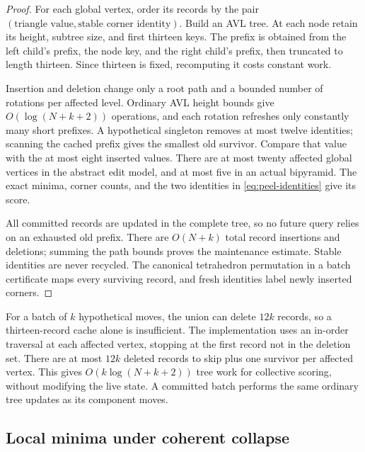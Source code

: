 \begin{proof}
For each global vertex, order its records by the pair
$(\text{triangle value},\text{stable corner identity})$. Build an AVL tree.
At each node retain its height, subtree size, and first thirteen keys.
The prefix is obtained from the left child's prefix, the node key, and
the right child's prefix, then truncated to length thirteen. Since
thirteen is fixed, recomputing it costs constant work.

Insertion and deletion change only a root path and a bounded number of
rotations per affected level. Ordinary AVL height bounds give
$O(\log(N+k+2))$ operations, and each rotation refreshes only constantly
many short prefixes. A hypothetical singleton removes at most twelve
identities; scanning the cached prefix gives the smallest old survivor.
Compare that value with the at most eight inserted values. There are
at most twenty affected global vertices in the abstract edit model, and
at most five in an actual bipyramid. The exact minima, corner counts,
and the two identities in \eqref{eq:peel-identities} give its score.

All committed records are updated in the complete tree, so no future
query relies on an exhausted old prefix. There are $O(N+k)$ total
record insertions and deletions; summing the path bounds proves the
maintenance estimate. Stable identities are never recycled. The
canonical tetrahedron permutation in a batch certificate maps every
surviving record, and fresh identities label newly inserted corners.
\end{proof}

For a batch of $k$ hypothetical moves, the union can delete $12k$
records, so a thirteen-record cache alone is insufficient. The
implementation uses an in-order traversal at each affected vertex,
stopping at the first record not in the deletion set. There are at
most $12k$ deleted records to skip plus one survivor per affected
vertex. This gives $O(k\log(N+k+2))$ tree work for collective scoring,
without modifying the live state. A committed batch performs the same
ordinary tree updates as its component moves.

\subsection{Local minima under coherent collapse}

